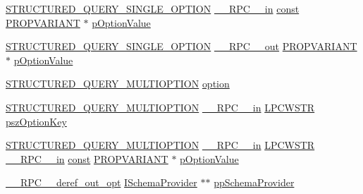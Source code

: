 \begin{DoxyCompactItemize}
\item 
\hyperlink{structuredquery_8h_a73f48b8aca2af5f76caa86174af94553}{S\+T\+R\+U\+C\+T\+U\+R\+E\+D\+\_\+\+Q\+U\+E\+R\+Y\+\_\+\+S\+I\+N\+G\+L\+E\+\_\+\+O\+P\+T\+I\+ON} \hyperlink{rpcsal_8h_a20b7f6da600a05c8b541659f14f7f0e6}{\+\_\+\+\_\+\+R\+P\+C\+\_\+\+\_\+in} \hyperlink{getopt1_8c_a2c212835823e3c54a8ab6d95c652660e}{const} \hyperlink{propidl_8h_ae902c1757cd16052896846fa4ebb88d8}{P\+R\+O\+P\+V\+A\+R\+I\+A\+NT} $\ast$ \hyperlink{struct_i_query_parser_vtbl_a07a27784f402cc48fc78a547cbaaeefd}{p\+Option\+Value}
\item 
\hyperlink{structuredquery_8h_a73f48b8aca2af5f76caa86174af94553}{S\+T\+R\+U\+C\+T\+U\+R\+E\+D\+\_\+\+Q\+U\+E\+R\+Y\+\_\+\+S\+I\+N\+G\+L\+E\+\_\+\+O\+P\+T\+I\+ON} \hyperlink{rpcsal_8h_aa518a2c78d44d75f3685c32c455c5ed8}{\+\_\+\+\_\+\+R\+P\+C\+\_\+\+\_\+out} \hyperlink{propidl_8h_ae902c1757cd16052896846fa4ebb88d8}{P\+R\+O\+P\+V\+A\+R\+I\+A\+NT} $\ast$ \hyperlink{struct_i_query_parser_vtbl_ac563f6831c6ebeaeb06f7ec701d22d04}{p\+Option\+Value}
\item 
\hyperlink{structuredquery_8h_acd18f4c0355d630a6c2e9017ba14a9c9}{S\+T\+R\+U\+C\+T\+U\+R\+E\+D\+\_\+\+Q\+U\+E\+R\+Y\+\_\+\+M\+U\+L\+T\+I\+O\+P\+T\+I\+ON} \hyperlink{struct_i_query_parser_vtbl_a26c0b82d3766c561e6deea530927206f}{option}
\item 
\hyperlink{structuredquery_8h_acd18f4c0355d630a6c2e9017ba14a9c9}{S\+T\+R\+U\+C\+T\+U\+R\+E\+D\+\_\+\+Q\+U\+E\+R\+Y\+\_\+\+M\+U\+L\+T\+I\+O\+P\+T\+I\+ON} \hyperlink{rpcsal_8h_a20b7f6da600a05c8b541659f14f7f0e6}{\+\_\+\+\_\+\+R\+P\+C\+\_\+\+\_\+in} \hyperlink{mapinls_8h_a25fda90f83ded0efd5456a4e7eda1e0c}{L\+P\+C\+W\+S\+TR} \hyperlink{struct_i_query_parser_vtbl_a69a2c48bfa55fc900b1c22fb47d23b6a}{psz\+Option\+Key}
\item 
\hyperlink{structuredquery_8h_acd18f4c0355d630a6c2e9017ba14a9c9}{S\+T\+R\+U\+C\+T\+U\+R\+E\+D\+\_\+\+Q\+U\+E\+R\+Y\+\_\+\+M\+U\+L\+T\+I\+O\+P\+T\+I\+ON} \hyperlink{rpcsal_8h_a20b7f6da600a05c8b541659f14f7f0e6}{\+\_\+\+\_\+\+R\+P\+C\+\_\+\+\_\+in} \hyperlink{mapinls_8h_a25fda90f83ded0efd5456a4e7eda1e0c}{L\+P\+C\+W\+S\+TR} \hyperlink{rpcsal_8h_a20b7f6da600a05c8b541659f14f7f0e6}{\+\_\+\+\_\+\+R\+P\+C\+\_\+\+\_\+in} \hyperlink{getopt1_8c_a2c212835823e3c54a8ab6d95c652660e}{const} \hyperlink{propidl_8h_ae902c1757cd16052896846fa4ebb88d8}{P\+R\+O\+P\+V\+A\+R\+I\+A\+NT} $\ast$ \hyperlink{struct_i_query_parser_vtbl_abf1f63a360bd6a67dc509544d130d726}{p\+Option\+Value}
\item 
\hyperlink{rpcsal_8h_ab29e89ceb0eb0b075c6f6299b0de6a21}{\+\_\+\+\_\+\+R\+P\+C\+\_\+\+\_\+deref\+\_\+out\+\_\+opt} \hyperlink{structuredquery_8h_afffb1fb827b569b0b58a1ba88756a965}{I\+Schema\+Provider} $\ast$$\ast$ \hyperlink{struct_i_query_parser_vtbl_a9eb2879f8e84e7020bf7b728ecdf8727}{pp\+Schema\+Provider}
$$
\end{DoxyCompactItemize}
